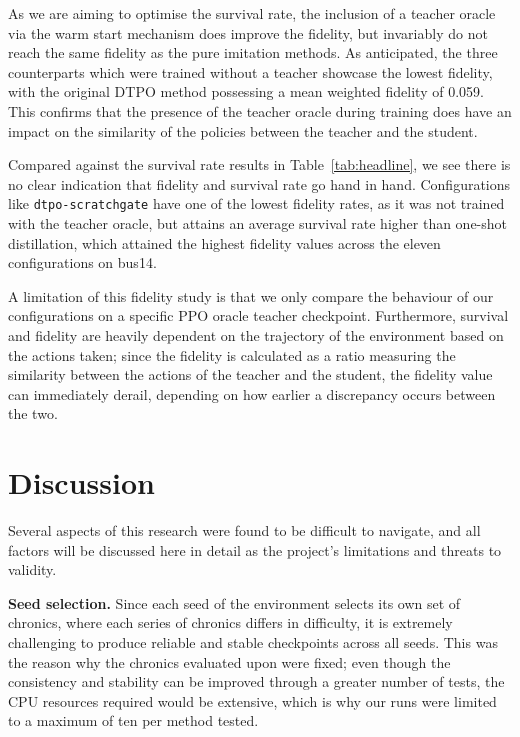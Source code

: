 As we are aiming to optimise the survival rate, the inclusion of a teacher oracle via the warm start mechanism does improve the fidelity, but invariably do not reach the same fidelity as the pure imitation methods. As anticipated, the three counterparts which were trained without a teacher showcase the lowest fidelity, with the original DTPO method possessing a mean weighted fidelity of 0.059. This confirms that the presence of the teacher oracle during training does have an impact on the similarity of the policies between the teacher and the student.

Compared against the survival rate results in Table~\ref{tab:headline}, we see there is no clear indication that fidelity and survival rate go hand in hand. Configurations like \texttt{dtpo-scratchgate} have one of the lowest fidelity rates, as it was not trained with the teacher oracle, but attains an average survival rate higher than one-shot distillation, which attained the highest fidelity values across the eleven configurations on bus14. 

A limitation of this fidelity study is that we only compare the behaviour of our configurations on a specific PPO oracle teacher checkpoint. Furthermore, survival and fidelity are heavily dependent on the trajectory of the environment based on the actions taken; since the fidelity is calculated as a ratio measuring the similarity between the actions of the teacher and the student, the fidelity value can immediately derail, depending on how earlier a discrepancy occurs between the two. 

\section{Discussion}


Several aspects of this research were found to be difficult to navigate, and all factors will be discussed here in detail as the project's limitations and threats to validity.

\textbf{Seed selection.} Since each seed of the environment selects its own set of chronics, where each series of chronics differs in difficulty, it is extremely challenging to produce reliable and stable checkpoints across all seeds. This was the reason why the chronics evaluated upon were fixed; even though the consistency and stability can be improved through a greater number of tests, the CPU resources required would be extensive, which is why our runs were limited to a maximum of ten per method tested.

